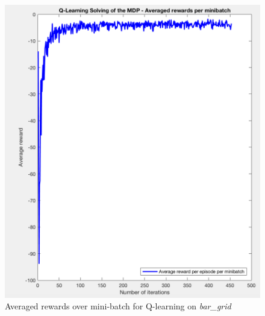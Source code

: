 \documentclass[a4paper]{report}
\begin{document}
{{{\begin{figure}[h!]
\begin{minipage}{0.4\linewidth}
						\includegraphics[width=\linewidth]{bargrid_ql_averaged_rewards}
						\caption{Averaged rewards over mini-batch for Q-learning on \emph{bar\_grid}}
					\end{minipage}
				\end{figure}

			}
		}
	}
	
\end{document}
